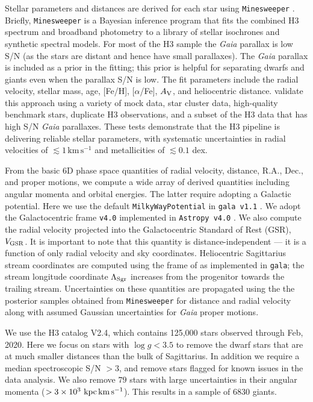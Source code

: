 \documentclass[twocolumn,tighten,twocolappendix]{aastex63}
\newcommand{\sgr}{Sagittarius}
\newcommand{\kms}{\mathrm{km} \, \mathrm{s}^{-1}}
\newcommand{\lunits}{{\rm kpc}\,{\rm km} \, {\rm s}^{-1}}
\newcommand{\NbLerr}{79}     %
\newcommand{\Ngiants}{6830} %
\newcommand{\minesweeper}{\texttt{Minesweeper}}
\begin{document}
\begin{CJK*}{UTF8}{gbsn}
Stellar parameters and distances are derived for each star using \minesweeper{}  \citep{Cargile19}.  Briefly, \minesweeper{} is a Bayesian inference program that fits the combined H3 spectrum and broadband photometry to a library of stellar isochrones and synthetic spectral models.  For most of the H3 sample the {\it Gaia} parallax is low S/N (as the stars are distant and hence have small parallaxes).  The {\it Gaia} parallax is included as a prior in the fitting; this prior is helpful for separating dwarfs and giants even when the parallax S/N is low.  The fit parameters include the radial velocity, stellar mass, age, [Fe/H], [$\alpha$/Fe], $A_{\rm V}$, and heliocentric distance.  \citet{Cargile19} validate this approach using a variety of mock data, star cluster data, high-quality benchmark stars, duplicate H3 observations, and a subset of the H3 data that has high S/N {\it Gaia} parallaxes.  These tests demonstrate that the H3 pipeline is delivering reliable stellar parameters, with systematic uncertainties in radial velocities of $\lesssim 1\,\kms$ and metallicities of $\lesssim 0.1$ dex.

From the basic 6D phase space quantities of radial velocity, distance, R.A., Dec., and proper motions, we compute a wide array of derived quantities including angular momenta and orbital energies.  The latter require adopting a Galactic potential.  Here we use the default \texttt{MilkyWayPotential} in \texttt{gala v1.1} \citep{gala1, gala2, bovy15}.  We adopt the Galactocentric frame \texttt{v4.0} implemented in \texttt{Astropy v4.0} \citep{astropy1, astropy2}.  We also compute the radial velocity projected into the Galactocentric Standard of Rest (GSR), $V_{\rm GSR}$.  It is important to note that this quantity is distance-independent --- it is a function of only radial velocity and sky coordinates.  Heliocentric \sgr{} stream coordinates are computed using the frame of \citet{Majewski03} as implemented in \texttt{gala}; the stream longitude coordinate $\Lambda_{\rm Sgr}$ increases from the progenitor towards the trailing stream. Uncertainties on these quantities are propagated using the the posterior samples obtained from \minesweeper{} for distance and radial velocity along with assumed Gaussian uncertainties for {\it Gaia} proper motions.

We use the H3 catalog V2.4, which contains 125,000 stars observed through Feb, 2020. Here we focus on stars with $\log g < 3.5$ to remove the dwarf stars that are at much smaller distances than the bulk of \sgr{}. In addition we require a median spectroscopic S/N $> 3$, and remove stars flagged for known issues in the data analysis.  We also remove $\NbLerr$ stars with large uncertainties in their angular momenta ($> 3\times 10^3 \,\, \lunits$).  This results in a sample of $\Ngiants$ giants.


\end{CJK*}
\end{document}
